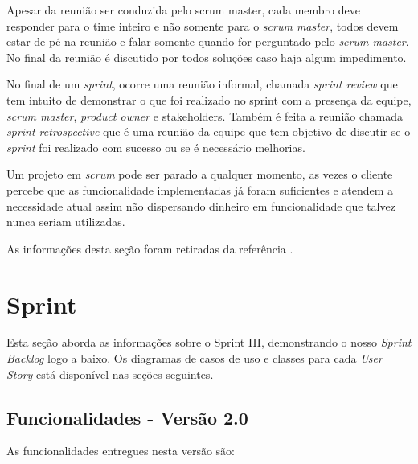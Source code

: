 \documentclass{abnt}
\begin{document}
			Apesar da reunião ser conduzida pelo scrum master, cada membro deve responder para o time inteiro e não somente para o
			\emph{scrum master}, todos devem estar de pé na reunião e falar somente quando for perguntado pelo \emph{scrum master}. No final da
			reunião é discutido por todos soluções caso haja algum impedimento.
			
			No final de um \emph{sprint}, ocorre uma reunião informal, chamada \emph{sprint review} que tem intuito de demonstrar o que foi 
			realizado no sprint com a presença da equipe, \emph{scrum master}, \emph{product owner} e stakeholders. Também é feita a reunião chamada \emph{sprint retrospective}
			que é uma reunião da equipe que tem objetivo de discutir se o \emph{sprint} foi realizado com sucesso ou se é necessário melhorias.
			
			Um projeto em \emph{scrum} pode ser parado a qualquer momento, as vezes o cliente percebe que as funcionalidade implementadas já foram
			suficientes e atendem a necessidade atual assim não dispersando dinheiro em funcionalidade que talvez nunca seriam utilizadas.
			
			As informações desta seção foram retiradas da referência \cite{SCRUMEPF}.
	
		
		
		

\clearpage

\chapter{Sprint}
	
		Esta seção aborda as informações sobre o Sprint III, demonstrando o nosso \emph{Sprint Backlog} logo a baixo. Os diagramas de casos de uso e classes para cada \emph{User Story} está disponível nas seções seguintes.
	
			
		\section{Funcionalidades - Versão 2.0}
		
			As funcionalidades entregues nesta versão são:
		
\end{document}
